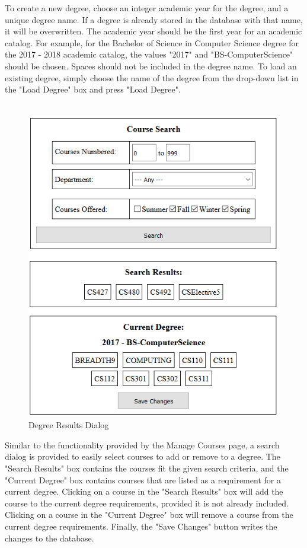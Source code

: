 \documentclass[]{article}
\begin{document}
		To create a new degree, choose an integer academic year for the degree, and a unique degree name. If a degree is already stored in the database with that name, it will be overwritten. The academic year should be the first year for an academic catalog. For example, for the Bachelor of Science in Computer Science degree for the 2017 - 2018 academic catalog, the values "2017" and "BS-ComputerScience" should be chosen. Spaces should not be included in the degree name. To load an existing degree, simply choose the name of the degree from the drop-down list in the "Load Degree" box and press "Load Degree".\\~\\
		\begin{figure}[H]
			\caption{Degree Results Dialog}
			\label{degreeresults}
			\centering
			\includegraphics{degreeresults.PNG}
		\end{figure}
		Similar to the functionality provided by the Manage Courses page, a search dialog is provided to easily select courses to add or remove to a degree. The "Search Results" box contains the courses fit the given search criteria, and the "Current Degree" box contains courses that are listed as a requirement for a current degree. Clicking on a course in the "Search Results" box will add the course to the current degree requirements, provided it is not already included. Clicking on a course in the "Current Degree" box will remove a course from the current degree requirements. Finally, the "Save Changes" button writes the changes to the database. 
		
\end{document}
